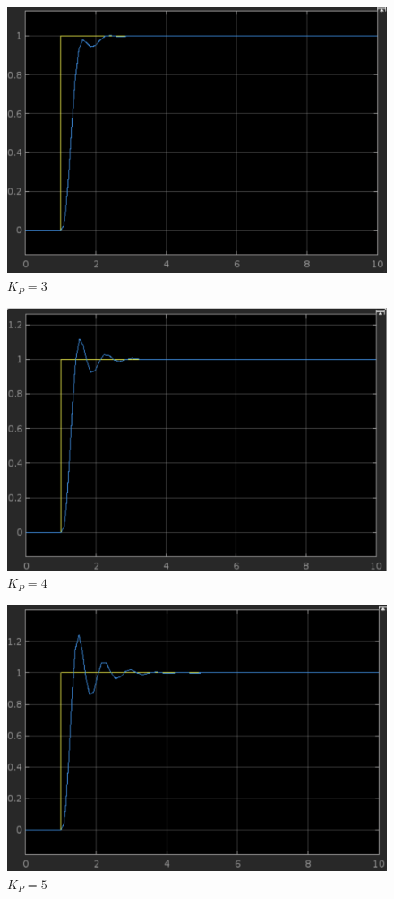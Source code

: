 \documentclass{article}
\begin{document}
				\begin{figure}[h]
					\includegraphics[scale=0.225, center]{2_c_KP_3.png}
					\caption{$K_P = 3$}
					\label{fig18: Graph_c_KP_3}
				\end{figure}					
\newpage
				\begin{figure}[h]
					\includegraphics[scale=0.225, center]{2_c_KP_4.png}
					\caption{$K_P = 4$}
					\label{fig19: Graph_c_KP_4}
				\end{figure}				
				\begin{figure}[h]
					\includegraphics[scale=0.225, center]{2_c_KP_5.png}
					\caption{$K_P = 5$}
					\label{fig20: Graph_c_KP_5}
				\end{figure}	
\end{document}
